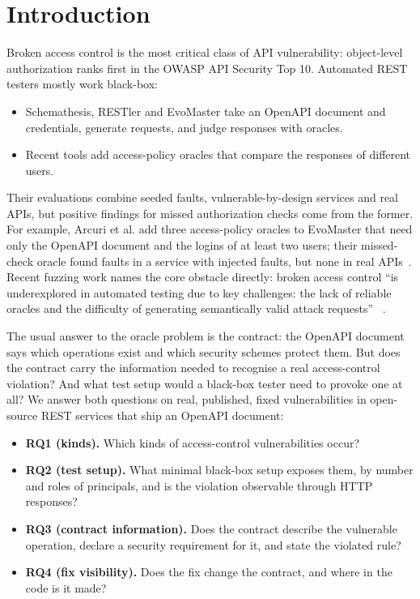 \documentclass[conference]{IEEEtran}
\begin{document}
\section{Introduction}
Broken access control is the most critical class of API vulnerability: object-level authorization ranks first in the OWASP API Security Top 10. Automated REST testers mostly work black-box:
\begin{itemize}
\item Schemathesis, RESTler and EvoMaster take an OpenAPI document and credentials, generate requests, and judge responses with oracles.
\item Recent tools add access-policy oracles that compare the responses of different users.
\end{itemize}

Their evaluations combine seeded faults, vulnerable-by-design services and real APIs, but positive findings for missed authorization checks come from the former. For example, Arcuri et al. add three access-policy oracles to EvoMaster that need only the OpenAPI document and the logins of at least two users; their missed-check oracle found faults in a service with injected faults, but none in real APIs~\cite{arcuri2025access}. Recent fuzzing work names the core obstacle directly: broken access control ``is underexplored in automated testing due to key challenges: the lack of reliable oracles and the difficulty of generating semantically valid attack requests'' ~\cite{arXiv2507_15984}.

The usual answer to the oracle problem is the contract: the OpenAPI document says which operations exist and which security schemes protect them. But does the contract carry the information needed to recognise a real access-control violation? And what test setup would a black-box tester need to provoke one at all? We answer both questions on real, published, fixed vulnerabilities in open-source REST services that ship an OpenAPI document:

\begin{itemize}
\item \textbf{RQ1 (kinds).} Which kinds of access-control vulnerabilities occur?
\item \textbf{RQ2 (test setup).} What minimal black-box setup exposes them, by number and roles of principals, and is the violation observable through HTTP responses?
\item \textbf{RQ3 (contract information).} Does the contract describe the vulnerable operation, declare a security requirement for it, and state the violated rule?
\item \textbf{RQ4 (fix visibility).} Does the fix change the contract, and where in the code is it made?
\end{itemize}
\end{document}
